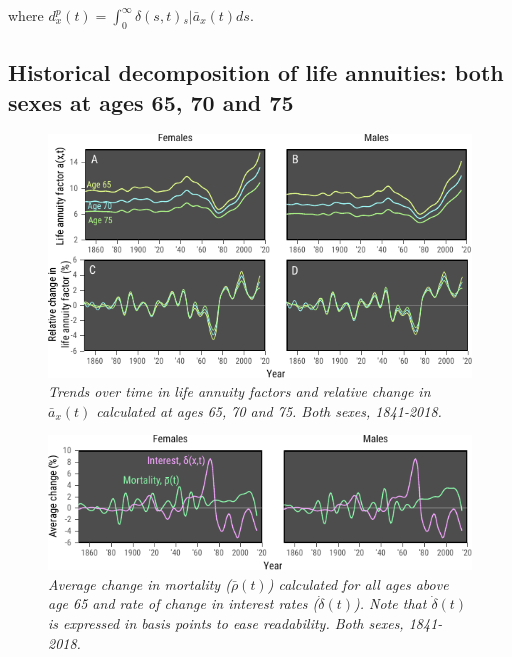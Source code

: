 \documentclass[12pt]{article}
\begin{document}
where ${d}^{p}_{x}(t)=\int_0^\infty \delta(s,t) {}_s|\bar{a}_x(t) ds$.


\subsection{Historical decomposition of life annuities: both sexes at ages 65, 70 and 75} \label{sec:olderages}


\begin{figure}[!ht]
	\centering
	\includegraphics[width=1\textwidth]{Fig/FigA1}
	\caption{\textit{Trends over time in life annuity factors and relative change in $\bar{a}_x(t)$ calculated at ages 65, 70 and 75. Both sexes, 1841-2018.}}
	\label{fig:FigA1}
\end{figure}




\begin{figure}[!ht]
	\centering
	\includegraphics[width=1\textwidth]{Fig/FigA2}
	\caption{\textit{Average change in mortality ($\bar{\rho}(t)$) calculated for all ages above age 65 and rate of change in interest rates ($\dot{\delta}(t)$). Note that $\dot{\delta}(t)$ is expressed in basis points to ease readability. Both sexes, 1841-2018.}}
	\label{fig:FigA2}
\end{figure}
\end{document}

